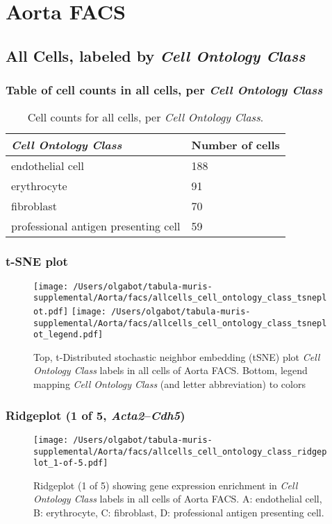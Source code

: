 \clearpage
\section{Aorta FACS}

\subsection{All Cells, labeled by \emph{Cell Ontology Class}}
\subsubsection{Table of cell counts in all cells, per \emph{Cell Ontology Class}}\begin{table}[h]
\centering
\label{my-label}
\begin{tabular}{@{}ll@{}}
\toprule

\emph{Cell Ontology Class}& Number of cells \\ \midrule
endothelial cell & 188 \\

erythrocyte & 91 \\

fibroblast & 70 \\

professional antigen presenting cell & 59 \\
\bottomrule
\end{tabular}
\caption{Cell counts for all cells, per \emph{Cell Ontology Class}.}
\end{table}

\clearpage
\subsubsection{t-SNE plot}
\begin{figure}[h]
\centering
\texttt{[image: /Users/olgabot/tabula-muris-supplemental/Aorta/facs/allcells\_cell\_ontology\_class\_tsneplot.pdf]}
\texttt{[image: /Users/olgabot/tabula-muris-supplemental/Aorta/facs/allcells\_cell\_ontology\_class\_tsneplot\_legend.pdf]}
\caption{Top, t-Distributed stochastic neighbor embedding (tSNE) plot  \emph{Cell Ontology Class} labels in all cells of Aorta FACS. Bottom, legend mapping \emph{Cell Ontology Class} (and letter abbreviation) to colors}
\end{figure}


\clearpage

\subsubsection{Ridgeplot (1 of 5, \emph{Acta2}--\emph{Cdh5})}
\begin{figure}[h]
\centering
\texttt{[image: /Users/olgabot/tabula-muris-supplemental/Aorta/facs/allcells\_cell\_ontology\_class\_ridgeplot\_1-of-5.pdf]}

\caption{ Ridgeplot (1 of 5)  showing gene expression enrichment in \emph{Cell Ontology Class} labels in all cells of Aorta FACS. A: endothelial cell, B: erythrocyte, C: fibroblast, D: professional antigen presenting cell.}
\end{figure}


